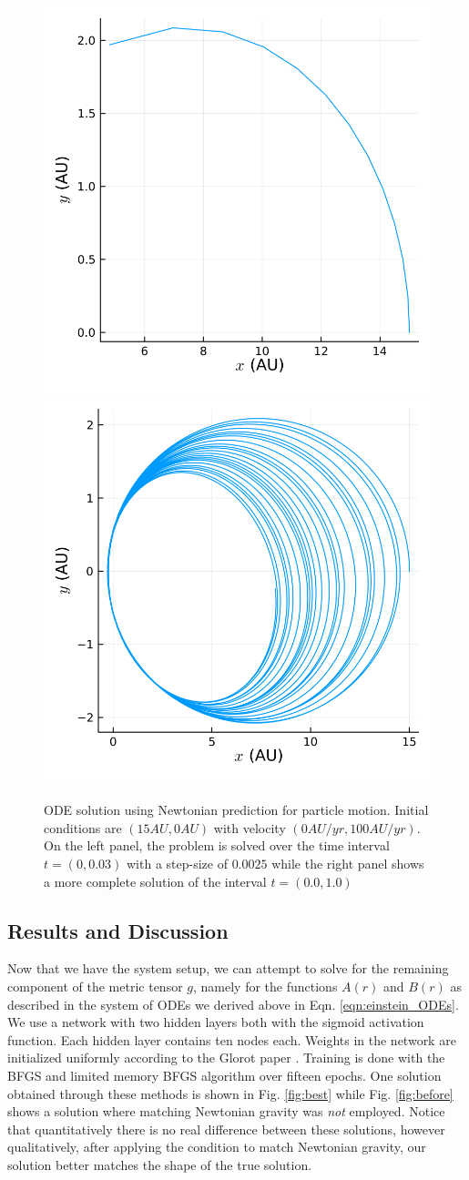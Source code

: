\documentclass{CUP-JNL-DTM}%
\theoremstyle{definition}
\numberwithin{equation}{section}
\begin{document}
\begin{figure}
    \centering
    \includegraphics[width=0.3\linewidth]{figures/newton_solution.png}
    \includegraphics[width=0.3\linewidth]{figures/newton_solution_complete.png}
    \caption{ODE solution using Newtonian prediction for particle motion. Initial conditions are $(15 \si{AU}, 0 \si{AU})$ with velocity $(0 \si{AU/yr}, 100 \si{AU/yr})$. On the left panel, the problem is solved over the time interval $t = (0, 0.03)$ with a step-size of $0.0025$ while the right panel shows a more complete solution of the interval $t = (0.0, 1.0)$}
    \label{fig:newton_sol}
\end{figure}

\subsection{Results and Discussion}

Now that we have the system setup, we can attempt to solve for the remaining component of the metric tensor $g$, namely for the functions $A(r)$ and $B(r)$ as described in the system of ODEs we derived above in Eqn. \ref{eqn:einstein_ODEs}. We use a network with two hidden layers both with the sigmoid activation function. Each hidden layer contains ten nodes each. Weights in the network are initialized uniformly according to the Glorot paper \cite{glorotUnderstandingDifficultyTraining2010}. Training is done with the BFGS and limited memory BFGS algorithm \cite{liuLimitedMemoryBFGS1989} over fifteen epochs. One solution obtained through these methods is shown in Fig. \ref{fig:best} while Fig. \ref{fig:before} shows a solution where matching Newtonian gravity was \emph{not} employed. Notice that quantitatively there is no real difference between these solutions, however qualitatively, after applying the condition to match Newtonian gravity, our solution better matches the shape of the true solution. 
\end{document}
